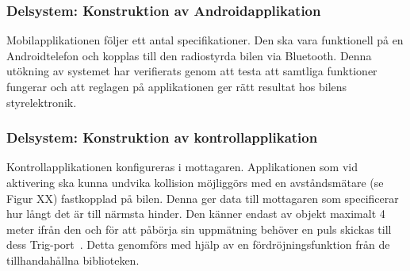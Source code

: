 \documentclass[a4paper]{article}
\begin{document}



\subsubsection{Delsystem: Konstruktion av Androidapplikation}
Mobilapplikationen följer ett antal specifikationer. Den ska vara funktionell på en Androidtelefon och kopplas till den radiostyrda bilen via Bluetooth. Denna utökning av systemet har verifierats genom att testa att samtliga funktioner fungerar och att reglagen på applikationen ger rätt resultat hos bilens styrelektronik. 




\subsubsection{Delsystem: Konstruktion av kontrollapplikation}
Kontrollapplikationen konfigureras i mottagaren. Applikationen som vid aktivering ska kunna undvika kollision möjliggörs med en avståndsmätare (se Figur XX) fastkopplad på bilen. Denna ger data till mottagaren som specificerar hur långt det är till närmsta hinder. Den känner endast av objekt maximalt 4 meter ifrån den och för att påbörja sin uppmätning behöver en puls skickas till dess Trig-port~\cite{DistMeasure}. Detta genomförs med hjälp av en fördröjningsfunktion från de tillhandahållna biblioteken.
\end{document}
